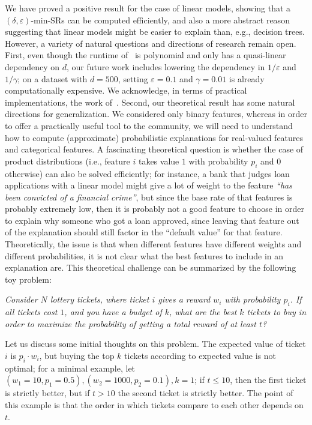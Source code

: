We have proved a positive result for the case of linear models, showing that a $(\delta, \varepsilon)$-min-SRs can be computed efficiently, and also a more abstract reason suggesting that linear models might be easier to explain than, e.g., decision trees. However,  a variety of natural questions and directions of research remain open. First, even though the runtime of~ is polynomial and only has a quasi-linear dependency on $d$, our future work includes lowering the dependency in $1/\varepsilon$ and $1/\gamma$; on a dataset with $d = 500$, setting $\varepsilon = 0.1$ and $\gamma = 0.01$ is already computationally expensive. We acknowledge, in terms of practical implementations, the work of~\citet{Louenas,izza2024locallyminimalprobabilisticexplanations,izzaComputingProbabilisticAbductive2023}. Second, our theoretical result has some natural directions for generalization. We considered only binary features, whereas in order to offer a practically useful tool to the community, we will need to understand how to compute (approximate) probabilistic explanations for real-valued features and categorical features. A fascinating theoretical question is whether the case of product distributions (i.e., feature $i$ takes value $1$ with probability $p_i$ and $0$ otherwise) can also be solved efficiently; for instance, a bank that judges loan applications with a linear model might give a lot of weight to the feature \emph{``has been convicted of a financial crime''}, but since the base rate of that features is probably extremely low, then it is probably not a good feature to choose in order to explain why someone who got a loan approved, since leaving that feature out of the explanation should still factor in the ``default value'' for that feature. Theoretically, the issue is that when different features have different weights and different probabilities, it is not clear what the best features to include in an explanation are. This theoretical challenge can be summarized by the following toy problem: 
\begin{center}
\emph{Consider $N$ lottery tickets, where ticket $i$ gives a reward $w_i$ with probability $p_i$. If all tickets cost $1$, and you have a budget of $k$, what are the best $k$ tickets to buy in order to maximize the probability of getting a total reward of at least $t$?}
\end{center}
Let us discuss some initial thoughts on this problem. The expected value of ticket $i$ is $p_i \cdot w_i$, but buying the top $k$ tickets according to expected value is not optimal; for a minimal example, let $(w_1 = 10, p_1 = 0.5), (w_2 = 1000, p_2 = 0.1), k = 1$; if $t  \leq 10$, then the first ticket is strictly better, but if $t > 10$ the second ticket is strictly better. The point of this example is that the order in which tickets compare to each other depends on $t$.
